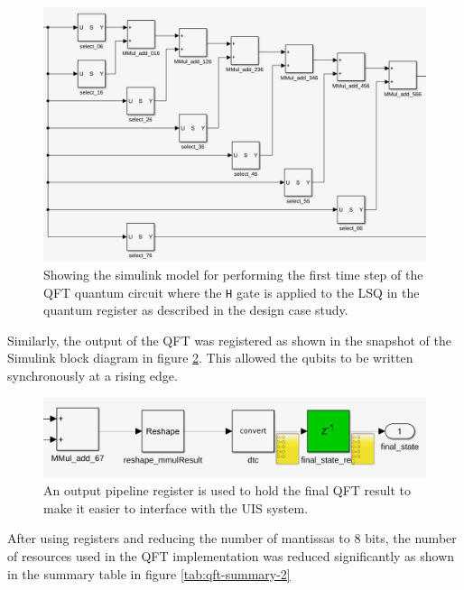 \begin{figure}[!ht]
	\centering
	\includegraphics[width=\linewidth]{body/ch6/figs/qft-simulink-2}
	\caption[Showing the Simulink Model for Performing the First Time Step of the QFT Quantum Circuit where the Hadamard Gate is Applied to the Least Significant Qubit in the Quantum Register.]{Showing the simulink model for performing the first time step of the QFT quantum circuit where the \texttt{H} gate is applied to the LSQ in the quantum register as described in the design case study.}
	\label{fig:qft-first}
\end{figure}
Similarly, the output of the QFT was registered as shown in the snapshot of the Simulink block diagram in figure \ref{fig:qft-output-reg}. This allowed the qubits to be written synchronously at a rising edge.
\begin{figure}[!ht]
	\centering
	\includegraphics[width=\linewidth]{body/ch6/figs/qft-simulink-3}
	\caption[Showing the Output Register of the Quantum Fourier Transform in Simulink.]{An output pipeline register is used to hold the final QFT result to make it easier to interface with the UIS system.}
	\label{fig:qft-output-reg}
\end{figure}
After using registers and reducing the number of mantissas to 8 bits, the number of resources used in the QFT implementation was reduced significantly as shown in the summary table in figure \ref{tab:qft-summary-2}

